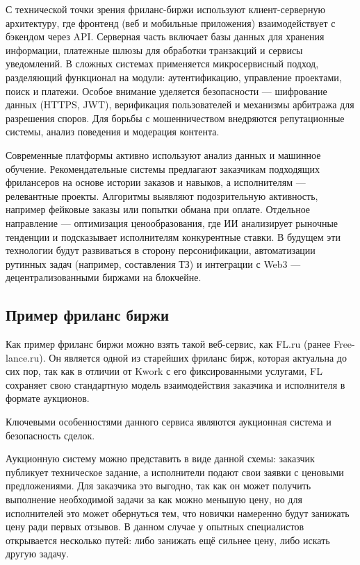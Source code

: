 С технической точки зрения фриланс-биржи используют клиент-серверную архитектуру, где фронтенд (веб и мобильные приложения) взаимодействует с бэкендом через API. Серверная часть включает базы данных для хранения информации, платежные шлюзы для обработки транзакций и сервисы уведомлений. В сложных системах применяется микросервисный подход, разделяющий функционал на модули: аутентификацию, управление проектами, поиск и платежи. Особое внимание уделяется безопасности — шифрование данных (HTTPS, JWT), верификация пользователей и механизмы арбитража для разрешения споров. Для борьбы с мошенничеством внедряются репутационные системы, анализ поведения и модерация контента.

Современные платформы активно используют анализ данных и машинное обучение. Рекомендательные системы предлагают заказчикам подходящих фрилансеров на основе истории заказов и навыков, а исполнителям — релевантные проекты. Алгоритмы выявляют подозрительную активность, например фейковые заказы или попытки обмана при оплате. Отдельное направление — оптимизация ценообразования, где ИИ анализирует рыночные тенденции и подсказывает исполнителям конкурентные ставки. В будущем эти технологии будут развиваться в сторону персонификации, автоматизации рутинных задач (например, составления ТЗ) и интеграции с Web3 — децентрализованными биржами на блокчейне.

\subsection{Пример фриланс биржи}

Как пример фриланс биржи можно взять такой веб-сервис, как FL.ru (ранее Free-lance.ru). Он является одной из старейших фриланс бирж, которая актуальна до сих пор, так как в отличии от Kwork с его фиксированными услугами, FL сохраняет свою стандартную модель взаимодействия заказчика и исполнителя в формате аукционов. 

Ключевыми особенностями данного сервиса являются аукционная система и безопасность сделок. 

Аукционную систему можно представить в виде данной схемы: заказчик публикует техническое задание, а исполнители подают свои заявки с ценовыми предложениями. Для заказчика это выгодно, так как он может получить выполнение необходимой задачи за как можно меньшую цену, но для исполнителей это может обернуться тем, что новички намеренно будут занижать цену ради первых отзывов. В данном случае у опытных специалистов открывается несколько путей: либо занижать ещё сильнее цену, либо искать другую задачу.

